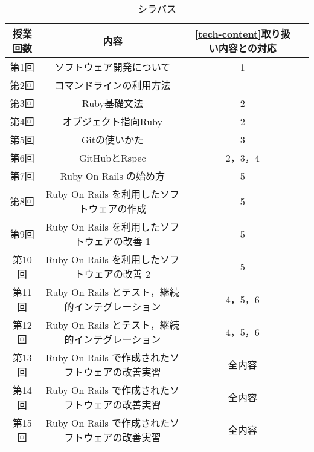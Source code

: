 \begin{table}[H]
  \begin{center}
    \caption{シラバス}
    \begin{tabular}{|c|c|c|c|}
      \hline
      授業回数 & 内容 & \ref{tech-content}取り扱い内容との対応 \\%
      \hline
      第1回 & ソフトウェア開発について & 1 \\%
      \hline
      第2回 & コマンドラインの利用方法 &  \\%
      \hline
      第3回 & Ruby基礎文法 &  2 \\%
      \hline
      第4回 & オブジェクト指向Ruby & 2 \\%
      \hline
      第5回 & Gitの使いかた & 3 \\%
      \hline
      第6回 & GitHubとRspec & 2，3，4 \\%
      \hline
      第7回 & Ruby On Rails の始め方 & 5 \\%
      \hline
      第8回 & Ruby On Rails を利用したソフトウェアの作成 & 5 \\%
      \hline
      第9回 & Ruby On Rails を利用したソフトウェアの改善 1 & 5 \\%
      \hline
      第10回 & Ruby On Rails を利用したソフトウェアの改善 2 & 5 \\%
      \hline
      第11回 & Ruby On Rails とテスト，継続的インテグレーション & 4，5，6 \\%
      \hline
      第12回 & Ruby On Rails とテスト，継続的インテグレーション & 4，5，6 \\%
      \hline
      第13回 & Ruby On Rails で作成されたソフトウェアの改善実習 & 全内容 \\%
      \hline
      第14回 & Ruby On Rails で作成されたソフトウェアの改善実習 & 全内容 \\%
      \hline
      第15回 & Ruby On Rails で作成されたソフトウェアの改善実習 & 全内容 \\%
      \hline
    \end{tabular}
    \label{tab:授業計画}
  \end{center}
\end{table}
